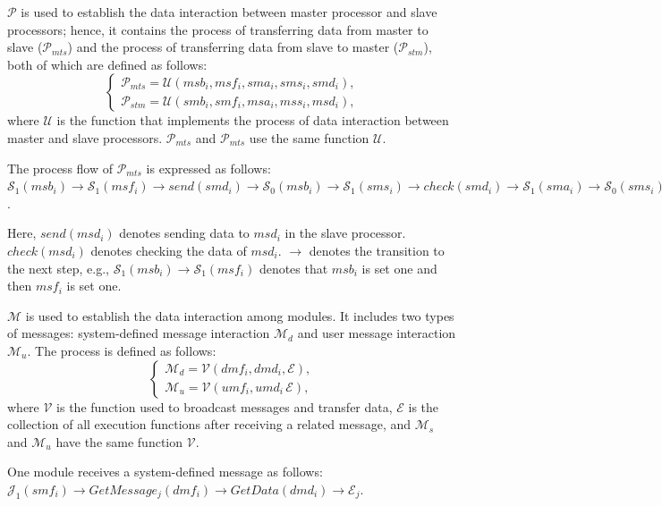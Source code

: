 \documentclass[journal,UTF8]{IEEEtran}
\begin{document}
$\mathcal{P}$ is used to establish the data interaction between master processor and slave processors; hence, it contains the process of transferring data from master to slave ($\mathcal{P}_{mts}$) and the process of transferring data from slave to master ($\mathcal{P}_{stm}$), both of which are defined as follows:
 \begin{equation}
 \left\{
 \begin{array}{l}
 \mathcal{P}_{mts} = \mathcal{U} (msb_i,msf_i,sma_i,sms_i,smd_i),\\
 \mathcal{P}_{stm} = \mathcal{U} (smb_i,smf_i,msa_i,mss_i,msd_i),
 \end{array}
 \right.
 \end{equation}
where $\mathcal{U}$ is the function that implements the process of data interaction between master and slave processors. $\mathcal{P}_{mts}$ and $\mathcal{P}_{mts}$ use the same function $\mathcal{U}$.

The process flow of $\mathcal{P}_{mts}$ is expressed  as follows:
 $\mathcal{S}_1(msb_i)\to\mathcal{S}_1(msf_i)\to send(smd_i)\to\mathcal{S}_0(msb_i)\to\mathcal{S}_1(sms_i)\to check(smd_i)\to\mathcal{S}_1(sma_i)\to\mathcal{S}_0(sms_i)\to\mathcal{S}_0(sma_i)\to\mathcal{S}_0(msf_i)$.
 
Here, $send(msd_i)$ denotes sending data to $msd_i$ in the slave processor. $check(msd_i)$ denotes checking the  data of $msd_i$. $\to$ denotes the transition to the next step, e.g., $\mathcal{S}_1(msb_i)\to\mathcal{S}_1(msf_i)$ denotes that $msb_i$ is set one and then $msf_i$ is set one.
 
$\mathcal{M}$ is used to establish the data interaction among modules. It includes two types of messages: system-defined message interaction $\mathcal{M}_{d}$ and user message interaction $\mathcal{M}_{u}$. The process is defined as follows:
 \begin{equation}
\left\{
\begin{array}{l}
\mathcal{M}_{d} = \mathcal{V} (dmf_i,dmd_i,\mathcal{E}),\\
\mathcal{M}_{u} = \mathcal{V} (umf_i,umd_i\,\mathcal{E}),
\end{array}
\right.
\end{equation}
where $\mathcal{V}$ is the function used to broadcast messages and transfer data, $\mathcal{E}$ is the collection of all execution functions after receiving a related message, and $\mathcal{M}_{s}$ and $\mathcal{M}_{u}$ have the same function $\mathcal{V}$.

One module receives a system-defined message as follows:
$\mathcal{J}_1(smf_i)\to GetMessage_{j}(dmf_i)\to GetData(dmd_i)\to\mathcal{E}_j$.
\end{document}
